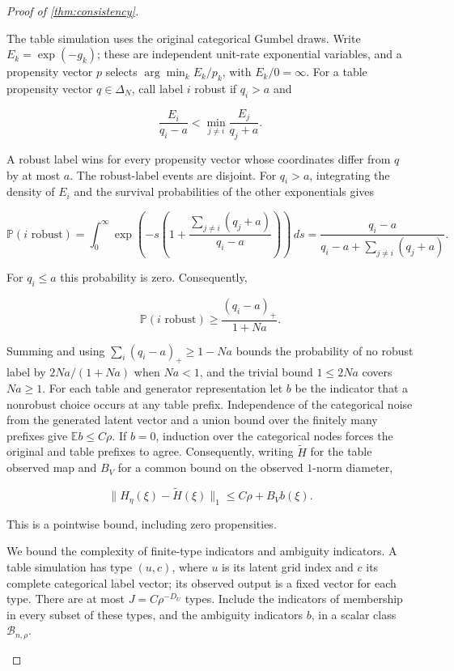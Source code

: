\begin{proof}[Proof of \cref{thm:consistency}]
\begin{enumerate}
The table simulation uses the original categorical Gumbel draws. Write $E_k=\exp(-g_k)$; these are independent unit-rate exponential variables, and a propensity vector $p$ selects $\arg\min_k E_k/p_k$, with $E_k/0=\infty$. For a table propensity vector $q\in\Delta_N$, call label $i$ robust if $q_i>a$ and

\[
\frac{E_i}{q_i-a}<\min_{j\ne i}\frac{E_j}{q_j+a}.
\]

A robust label wins for every propensity vector whose coordinates differ from $q$ by at most $a$. The robust-label events are disjoint. For $q_i>a$, integrating the density of $E_i$ and the survival probabilities of the other exponentials gives

\[
\mathbb P(i\text{ robust})=\int_0^\infty\exp\left(-s\left(1+\frac{\sum_{j\ne i}(q_j+a)}{q_i-a}\right)\right)\,ds
=\frac{q_i-a}{q_i-a+\sum_{j\ne i}(q_j+a)}.
\]

For $q_i\leqslant a$ this probability is zero. Consequently,

\[
\mathbb P(i\text{ robust})\geqslant\frac{(q_i-a)_+}{1+Na}.
\]

Summing and using $\sum_i(q_i-a)_+\geqslant1-Na$ bounds the probability of no robust label by $2Na/(1+Na)$ when $Na<1$, and the trivial bound $1\leqslant2Na$ covers $Na\geqslant1$. For each table and generator representation let $b$ be the indicator that a nonrobust choice occurs at any table prefix. Independence of the categorical noise from the generated latent vector and a union bound over the finitely many prefixes give $\mathbb E b\leqslant C\rho$. If $b=0$, induction over the categorical nodes forces the original and table prefixes to agree. Consequently, writing $\widetilde H$ for the table observed map and $B_V$ for a common bound on the observed $1$-norm diameter,

\[
\|H_\eta(\xi)-\widetilde H(\xi)\|_1\leqslant C\rho+B_V b(\xi).
\]

This is a pointwise bound, including zero propensities. 

We bound the complexity of finite-type indicators and ambiguity indicators. A table simulation has type $(u,c)$, where $u$ is its latent grid index and $c$ its complete categorical label vector; its observed output is a fixed vector for each type. There are at most $J=C\rho^{-D_U}$ types. Include the indicators of membership in every subset of these types, and the ambiguity indicators $b$, in a scalar class $\mathcal B_{n,\rho}$. 


\end{enumerate}
\end{proof}
